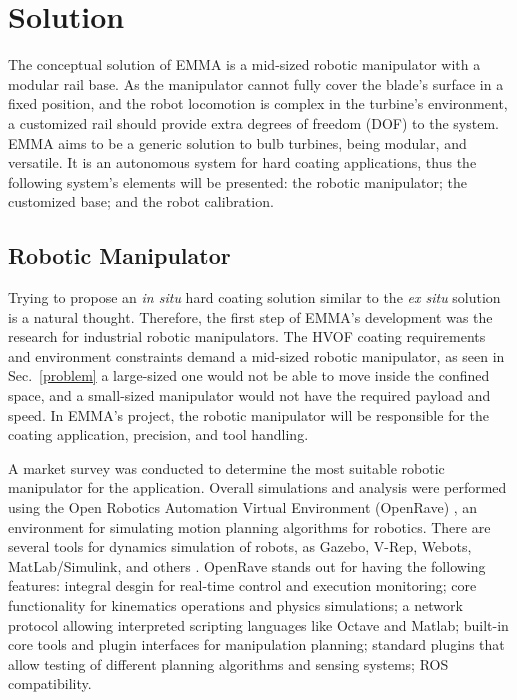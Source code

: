 \section{Solution}\label{solution}


The conceptual solution of EMMA is a mid-sized robotic manipulator with a
modular rail base. As the manipulator cannot fully cover the blade's surface in
a fixed position, and the robot locomotion is complex in the turbine's
environment, a customized rail should provide extra degrees of freedom (DOF) to
the system. EMMA aims to be a generic solution to bulb turbines, being modular,
and versatile. It is an autonomous system for hard coating applications, thus
the following system's elements will be presented: the robotic manipulator; the
customized base; and the robot calibration.


\subsection{Robotic Manipulator}\label{manipulator}
Trying to propose an \textit{in situ} hard coating solution similar to
the \textit{ex situ} solution is a natural thought. Therefore, the first step of
EMMA's development was the research for industrial robotic manipulators. The
HVOF coating requirements and environment constraints demand a mid-sized
robotic manipulator, as seen in Sec.~\ref{problem} a large-sized one would not
be able to move inside the confined space, and a small-sized manipulator would not
have the required payload and speed. In EMMA's project, the
robotic manipulator will be responsible for the coating application, precision, and tool handling.

A market survey was conducted to determine the most suitable robotic
manipulator for the application. Overall simu\-lations and analysis were performed using the Open
Robotics Automation Virtual Environment (OpenRave) \cite{diankov2008openrave},
an environment for simulating motion planning algorithms for robotics. There are
several tools for dynamics simulation of robots, as Gazebo, V-Rep,
Webots, MatLab/Simulink, and others%
. OpenRave stands out
for having the following features: integral desgin for real-time control and
execution monitoring; core functionality for kinematics operations and
physics simulations; a network protocol allowing interpreted scripting languages
like Octave and Matlab; built-in core tools and plugin interfaces for
manipulation planning; standard plugins that allow testing of different planning
algorithms and sensing systems; ROS compatibility.

